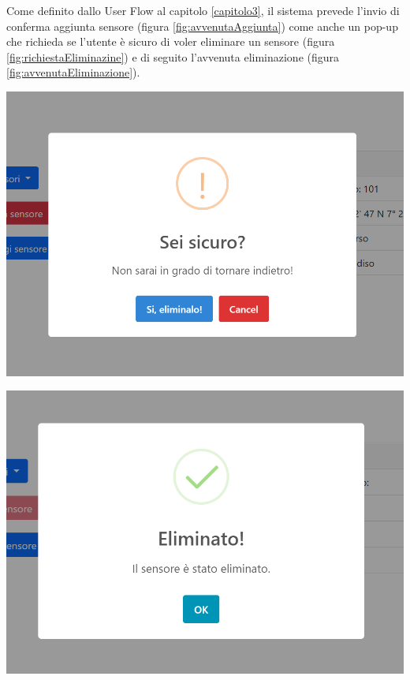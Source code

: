 Come definito dallo User Flow al capitolo \ref{capitolo3}, il sistema prevede l'invio di conferma aggiunta sensore (figura \ref{fig:avvenutaAggiunta}) come anche un pop-up che richieda se l'utente è sicuro di voler eliminare un sensore (figura \ref{fig:richiestaEliminazine}) e di seguito l'avvenuta eliminazione (figura \ref{fig:avvenutaEliminazione}).

\begin{multicols}{2}
     \begin{Figure}
        \centering
        \includegraphics[scale=0.45]{Img/confermaEliminazione.png}
        \label{fig:richiestaEliminazine}
    \end{Figure}
    \begin{Figure}
        \centering
        \includegraphics[scale=0.47]{Img/eliminato.png}
        \label{fig:avvenutaEliminazione}
    \end{Figure}
\end{multicols}

